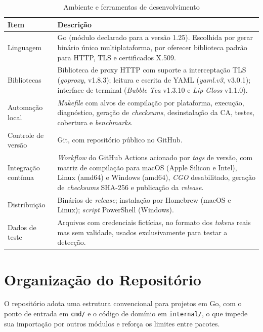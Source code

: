\begin{table}[htb]
\centering
\caption{Ambiente e ferramentas de desenvolvimento}\label{tab:ambiente}
\small
\begin{tabular}{|p{3.6cm}|p{10.3cm}|}
\hline
\textbf{Item} & \textbf{Descrição} \\ \hline
Linguagem & Go (módulo declarado para a versão 1.25). Escolhida por gerar binário único multiplataforma, por oferecer biblioteca padrão para HTTP, TLS e certificados X.509. \\ \hline
Bibliotecas & Biblioteca de proxy HTTP com suporte a interceptação TLS (\textit{goproxy}, v1.8.3); leitura e escrita de YAML (\textit{yaml.v3}, v3.0.1); interface de terminal (\textit{Bubble Tea} v1.3.10 e \textit{Lip Gloss} v1.1.0). \\ \hline
Automação local & \textit{Makefile} com alvos de compilação por plataforma, execução, diagnóstico, geração de \textit{checksums}, desinstalação da CA, testes, cobertura e \textit{benchmarks}. \\ \hline
Controle de versão & Git, com repositório público no GitHub. \\ \hline
Integração contínua & \textit{Workflow} do GitHub Actions acionado por \textit{tags} de versão, com matriz de compilação para macOS (Apple Silicon e Intel), Linux (amd64) e Windows (amd64), \textit{CGO} desabilitado, geração de \textit{checksums} SHA-256 e publicação da \textit{release}. \\ \hline
Distribuição & Binários de \textit{release}; instalação por Homebrew (macOS e Linux); \textit{script} PowerShell (Windows). \\ \hline
Dados de teste & Arquivos com credenciais fictícias, no formato dos \textit{tokens} reais mas sem validade, usados exclusivamente para testar a detecção. \\ \hline
\end{tabular}
\end{table}

\section{Organização do Repositório}
\label{sec:dev_repo}

O repositório adota uma estrutura convencional para projetos em Go, com o ponto de entrada em \texttt{cmd/} e o código de domínio em \texttt{internal/}, o que impede sua importação por outros módulos e reforça os limites entre pacotes.

